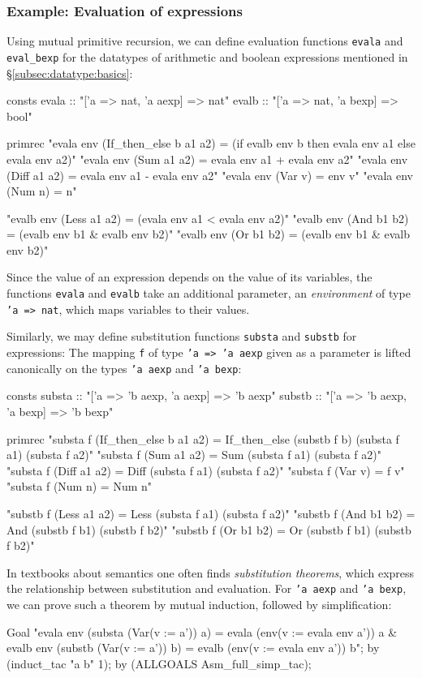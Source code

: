 \subsubsection{Example: Evaluation of expressions}
Using mutual primitive recursion, we can define evaluation functions \texttt{evala}
and \texttt{eval_bexp} for the datatypes of arithmetic and boolean expressions mentioned in
{\S}\ref{subsec:datatype:basics}:
\begin{ttbox}
consts
  evala :: "['a => nat, 'a aexp] => nat"
  evalb :: "['a => nat, 'a bexp] => bool"

primrec
  "evala env (If_then_else b a1 a2) =
     (if evalb env b then evala env a1 else evala env a2)"
  "evala env (Sum a1 a2) = evala env a1 + evala env a2"
  "evala env (Diff a1 a2) = evala env a1 - evala env a2"
  "evala env (Var v) = env v"
  "evala env (Num n) = n"

  "evalb env (Less a1 a2) = (evala env a1 < evala env a2)"
  "evalb env (And b1 b2) = (evalb env b1 & evalb env b2)"
  "evalb env (Or b1 b2) = (evalb env b1 & evalb env b2)"
\end{ttbox}
Since the value of an expression depends on the value of its variables,
the functions \texttt{evala} and \texttt{evalb} take an additional
parameter, an {\em environment} of type \texttt{'a => nat}, which maps
variables to their values.

Similarly, we may define substitution functions \texttt{substa}
and \texttt{substb} for expressions: The mapping \texttt{f} of type
\texttt{'a => 'a aexp} given as a parameter is lifted canonically
on the types \texttt{'a aexp} and \texttt{'a bexp}:
\begin{ttbox}
consts
  substa :: "['a => 'b aexp, 'a aexp] => 'b aexp"
  substb :: "['a => 'b aexp, 'a bexp] => 'b bexp"

primrec
  "substa f (If_then_else b a1 a2) =
     If_then_else (substb f b) (substa f a1) (substa f a2)"
  "substa f (Sum a1 a2) = Sum (substa f a1) (substa f a2)"
  "substa f (Diff a1 a2) = Diff (substa f a1) (substa f a2)"
  "substa f (Var v) = f v"
  "substa f (Num n) = Num n"

  "substb f (Less a1 a2) = Less (substa f a1) (substa f a2)"
  "substb f (And b1 b2) = And (substb f b1) (substb f b2)"
  "substb f (Or b1 b2) = Or (substb f b1) (substb f b2)"
\end{ttbox}
In textbooks about semantics one often finds {\em substitution theorems},
which express the relationship between substitution and evaluation. For
\texttt{'a aexp} and \texttt{'a bexp}, we can prove such a theorem by mutual
induction, followed by simplification:
\begin{ttbox}
Goal
  "evala env (substa (Var(v := a')) a) =
     evala (env(v := evala env a')) a &
   evalb env (substb (Var(v := a')) b) =
     evalb (env(v := evala env a')) b";
by (induct_tac "a b" 1);
by (ALLGOALS Asm_full_simp_tac);
\end{ttbox}

